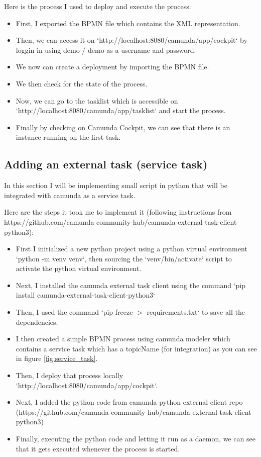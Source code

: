 \documentclass[12pt]{article}
\begin{document}
{Here is the process I used to deploy and execute the process:

\begin{itemize}
  \item First, I exported the BPMN file which contains the XML representation.
  \item Then, we can access it on `http://localhost:8080/camunda/app/cockpit` by loggin in using demo / demo as a username and password.
  \item We now can create a deployment by importing the BPMN file.
  \item We then check for the state of the process.
  \item Now, we can go to the tasklist which is accessible on `http://localhost:8080/camunda/app/tasklist` and start the process.
  \item Finally by checking on Camunda Cockpit, we can see that there is an instance running on the first task.
\end{itemize}

  \subsection{Adding an external task (service task)}

In this section I will be implementing small script in python that will be integrated with camunda as a service task.

Here are the steps it took me to implement it (following instructions from https://github.com/camunda-community-hub/camunda-external-task-client-python3):

\begin{itemize}
  \item First I initialized a new python project using a python virtual environment `python -m venv venv`, then sourcing the `venv/bin/activate` script to activate the python virtual environment.
  \item Next, I installed the camunda external task client using the command `pip install camunda-external-task-client-python3`
  \item Then, I used the command `pip freeze $ > $ requirements.txt` to save all the dependencies.
  \item I then created a simple BPMN process using camunda modeler which contains a service task which has a topicName (for integration) as you can see in figure \ref{fig:service_task}.
  \item Then, I deploy that process locally `http://localhost:8080/camunda/app/cockpit`.
  \item Next, I added the python code from camunda python external client repo (https://github.com/camunda-community-hub/camunda-external-task-client-python3)
  \item Finally, executing the python code and letting it run as a daemon, we can see that it gets executed whenever the process is started.
\end{itemize}

}
\end{document}
